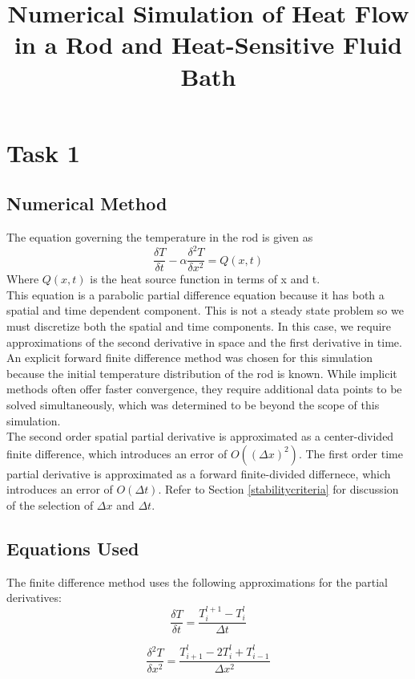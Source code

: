 \documentclass[12pt]{amsart}
\title{Numerical Simulation of Heat Flow in a Rod and Heat-Sensitive Fluid Bath}
\author{}
\date{} %
\begin{document}
\maketitle
\section{Task 1}
\subsection{Numerical Method}
The equation governing the temperature in the rod is given as
\begin{equation}
\frac{\delta T}{\delta t} - \alpha \frac{\delta^2 T}{\delta x ^2} = Q(x,t)
\label{eq:begin}
\end{equation}
Where $Q(x,t)$ is the heat source function in terms of x and t.\\
This equation is a parabolic partial difference equation because it has both a spatial and time dependent component. This is not a steady state problem so we must discretize both the spatial and time components. In this case, we require approximations of the second derivative in space and the first derivative in time. An explicit forward finite difference method was chosen for this simulation because the initial temperature distribution of the rod is known. 
While implicit methods often offer faster convergence, they require additional data points to be solved simultaneously, which was determined to be beyond the scope of this simulation. \\
The second order spatial partial derivative is approximated as a center-divided finite difference, which introduces an error of $O((\Delta x)^2
)$. The first order time partial derivative is approximated as a forward finite-divided differnece, which introduces an error of $O(\Delta t)$. Refer to Section \ref{stabilitycriteria} for discussion of the selection of $\Delta x$ and $\Delta t$. 
\subsection{Equations Used}

The finite difference method uses the following approximations for the partial derivatives:
\begin{equation}
\frac{\delta T}{\delta t} = \frac{T^{l+1}_i - T^l_i}{\Delta t}
\label{eq:dTdtapprx}
\end{equation}

\begin{equation}
\frac{\delta^2 T}{\delta x^2} = \frac{T^l_{i+1} - 2T^l_i + T^l_{i-1}}{\Delta x^2}
\label{eq:dTdxapprx}
\end{equation}
\end{document}
